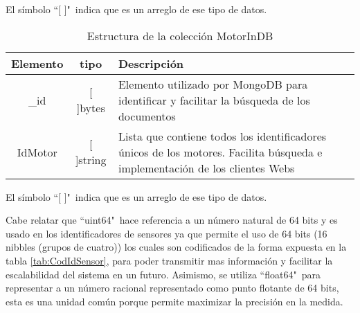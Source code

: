 \begin{table}[ht]
\begin{center}
            \vspace{0.5cm}
            El símbolo ``[  ]"\  indica que es un arreglo de ese tipo de datos.
        \end{center}
    \end{table}

\vspace{1cm}


    \begin{table}[ht]
        \begin{center}
        \caption[Estructura de MotorInDB]{Estructura de la colección MotorInDB}
        \label{tab:MotorInDBbson}
            \vspace{0.3cm}
            \begin{tabular}{|c|c|p{11cm}|}
                \hline
                Elemento & tipo     & Descripción \\\hline\hline
                \_id      & [ ]bytes  & Elemento utilizado por MongoDB para
                identificar y facilitar la búsqueda de los documentos\\\hline
                IdMotor  & [ ]string & Lista que contiene todos los identificadores
                únicos de los motores. Facilita búsqueda e implementación de los
                clientes Webs\\\hline
            \end{tabular}

            \vspace{0.5cm}
            El símbolo ``[ ]"\ indica que es un arreglo de ese tipo de datos.
        \end{center}
    \end{table}

    Cabe relatar que ``uint64"\  hace referencia a un número natural de 64 bits
    y es usado en los identificadores de sensores ya que permite el uso de 64
    bits (16 nibbles (grupos de cuatro)) los cuales son codificados de
    la forma expuesta en la tabla      \ref{tab:CodIdSensor}, para
    poder transmitir mas información y facilitar la escalabilidad del sistema en
    un futuro.
    Asimismo, se utiliza
    ``float64"\ para representar  a un número racional representado como punto
    flotante de 64 bits, esta es una unidad común porque permite maximizar la
    precisión en la medida.

